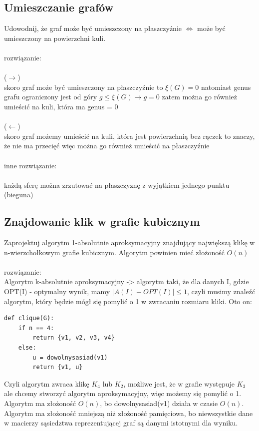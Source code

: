 \documentclass{article}
\begin{document}
\subsection*{Umieszczanie grafów}
Udowodnij, że graf może być umieszczony na płaszczyźnie $\iff$ może być umieszczony na powierzchni kuli. \\\\rozwiązanie:\\\\
($\longrightarrow$)\\
skoro graf może być umieszczony na płaszczyźnie to $\xi(G) = 0$ natomiast genus grafu ograniczony jest od góry $g \leq \xi(G) \rightarrow g = 0$ zatem można go również umieścić na kuli, która ma genus = 0\\\\
($\longleftarrow$) \\
skoro graf możemy umieścić na kuli, która jest powierzchnią bez rączek to znaczy, że nie ma przecięć więc można go również umieścić na płaszczyźnie \\\\
inne rozwiązanie:\\\\
każdą sferę można zrzutować na płaszczyznę z wyjątkiem jednego punktu (bieguna)



\subsection*{Znajdowanie klik w grafie kubicznym}
Zaprojektuj algorytm 1-absolutnie aproksymacyjny znajdujący największą klikę w n-wierzchołkowym grafie kubicznym. Algorytm powinien mieć złożoność $O(n)$ \\\\rozwiązanie:\\
Algorytm k-absolutnie aproksymacyjny -> algorytm taki, że dla danych I, gdzie OPT(I) - optymalny wynik, mamy $|A(I) - OPT(I)| \leq 1$, czyli musimy znaleźć algorytm, 
który będzie mógł się pomylić o 1 w zwracaniu rozmiaru kliki. Oto on:

\begin{lstlisting}
def clique(G):
	if n == 4:
		return {v1, v2, v3, v4}
	else:
		u = dowolnysasiad(v1)
		return {v1, u}
\end{lstlisting}
Czyli algorytm zwraca klikę $K_4$ lub $K_2$,  możliwe jest, że w grafie występuje $K_3$ ale chcemy stworzyć algorytm aproksymacyjny, więc możemy się pomylić o 1.
Algorytm ma złożoność $O(n)$, bo dowolnysasiad(v1) działa w czasie $O(n)$. Algorytm ma złożoność mniejszą niż złożoność pamięciowa, bo niewszystkie dane w macierzy 
sąsiedztwa reprezentującej graf są danymi istotnymi dla wyniku.
\end{document}
